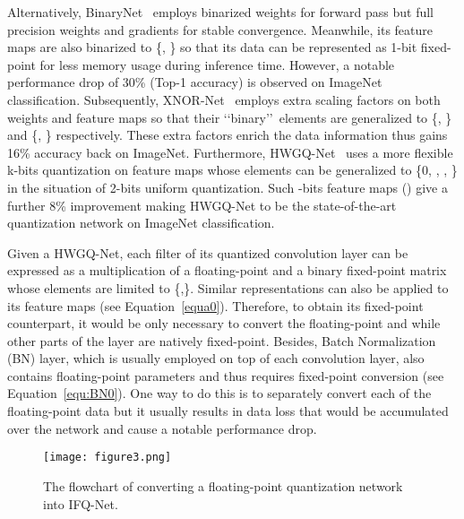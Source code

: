 \documentclass[10pt,twocolumn,letterpaper]{article}
\begin{document}
Alternatively, BinaryNet~\cite{BinaryConnect} employs binarized weights for forward pass but full precision weights and gradients for stable convergence. Meanwhile, its feature maps are also binarized to \{, \} so that its data can be represented as 1-bit fixed-point for less memory usage during inference time. However, a notable performance drop of 30\% (Top-1 accuracy) is observed on ImageNet classification. Subsequently, XNOR-Net~\cite{XNOR} employs extra scaling factors on both weights and feature maps so that their \lq\lq binary\rq\rq\, elements are generalized to \{, \} and \{, \} respectively. These extra factors enrich the data information thus gains 16\% accuracy back on ImageNet. Furthermore, HWGQ-Net~\cite{HWGQ} uses a more flexible k-bits quantization on feature maps whose elements can be generalized to \{0, , , \} in the situation of 2-bits uniform quantization. Such -bits feature maps () give a further 8\% improvement making HWGQ-Net to be the state-of-the-art quantization network on ImageNet classification.



Given a HWGQ-Net, each filter of its quantized convolution layer can be expressed as a multiplication of a floating-point  and a binary fixed-point matrix whose elements are limited to \{,\}. Similar representations can also be applied to its feature maps (see Equation~\ref{equa0}). Therefore, to obtain its fixed-point counterpart, it would be only necessary to convert the floating-point  and  while other parts of the layer are natively fixed-point. Besides, Batch Normalization (BN) layer, which is usually employed on top of each convolution layer, also contains floating-point parameters and thus requires fixed-point conversion (see Equation~\ref{equ:BN0}). One way to do this is to separately convert each of the floating-point data but it usually results in data loss that would be accumulated over the network and cause a notable performance drop.

\begin{figure}[t]
\begin{center}
\texttt{[image: figure3.png]}
\end{center}
\caption{The flowchart of converting a floating-point quantization network into IFQ-Net.}
\label{fig:flowchart}
\end{figure}
\end{document}
